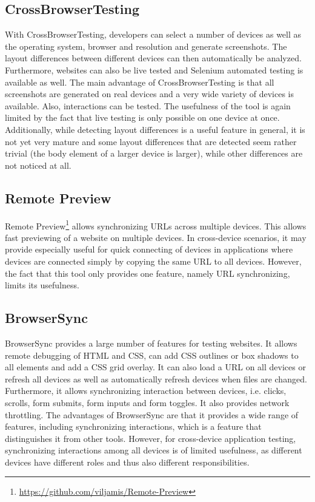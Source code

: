 \subsection{CrossBrowserTesting}

With CrossBrowserTesting, developers can select a number of devices as well as the operating system, browser and resolution and generate screenshots. The layout differences between different devices can then automatically be analyzed. Furthermore, websites can also be live tested and Selenium automated testing is available as well. The main advantage of CrossBrowserTesting is that all screenshots are generated on real devices and a very wide variety of devices is available. Also, interactions can be tested. The usefulness of the tool is again limited by the fact that live testing is only possible on one device at once. Additionally, while detecting layout differences is a useful feature in general, it is not yet very mature and some layout differences that are detected seem rather trivial (the body element of a larger device is larger), while other differences are not noticed at all.

\subsection{Remote Preview}

Remote Preview\footnote{\url{https://github.com/viljamis/Remote-Preview}} allows synchronizing URLs across multiple devices. This allows fast previewing of a website on multiple devices. In cross-device scenarios, it may provide especially useful for quick connecting of devices in applications where devices are connected simply by copying the same URL to all devices. However, the fact that this tool only provides one feature, namely URL synchronizing, limits its usefulness.

\subsection{BrowserSync}

BrowserSync provides a large number of features for testing websites. It allows remote debugging of HTML and CSS, can add CSS outlines or box shadows to all elements and add a CSS grid overlay. It can also load a URL on all devices or refresh all devices as well as automatically refresh devices when files are changed. Furthermore, it allows synchronizing interaction between devices, i.e. clicks, scrolls, form submits, form inputs and form toggles. It also provides network throttling. The advantages of BrowserSync are that it provides a wide range of features, including synchronizing interactions, which is a feature that distinguishes it from other tools. However, for cross-device application testing, synchronizing interactions among all devices is of limited usefulness, as different devices have different roles and thus also different responsibilities.

